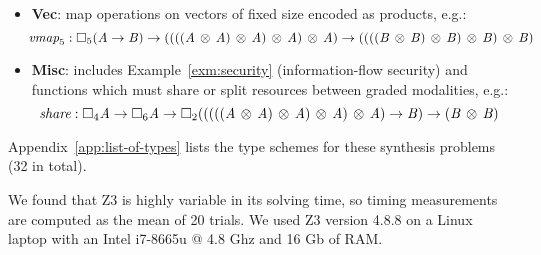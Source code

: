 \begin{itemize}[itemsep=0em,leftmargin=1.1em]
\item \textbf{Vec}: map operations on
vectors of fixed size encoded as products, e.g.:
%
\begin{equation*}
\!\!
\textit{vmap}_5 : \Box_{  5  }  (  \mathit{A}  \rightarrow  \mathit{B}  )    \rightarrow   (   (   (   (   \mathit{A}  \, \otimes \,  \mathit{A}   )  \, \otimes \,  \mathit{A}   )  \, \otimes \,  \mathit{A}   )  \, \otimes \,  \mathit{A}   )  \rightarrow  (   (   (   (   \mathit{B}  \, \otimes \,  \mathit{B}   )  \, \otimes \,  \mathit{B}   )  \, \otimes \,  \mathit{B}   )  \, \otimes \,  \mathit{B}   )
\end{equation*}
%

\item \textbf{Misc}: includes Example~\ref{exm:security}
  (information-flow security) and  functions which must share or split resources
between graded modalities, e.g.:
%
\begin{equation*}
\!\!
\textit{share}: \Box_{  4  }  \mathit{A}    \rightarrow     \Box_{  6  }  \mathit{A}    \rightarrow    \Box_{  2  }   (   (    (    (    (   \mathit{A}  \, \otimes \,  \mathit{A}   )   \, \otimes \,  \mathit{A}   )   \, \otimes \,  \mathit{A}   )   \, \otimes \,  \mathit{A}   )   \rightarrow  \mathit{B}  )       \rightarrow   (   \mathit{B}  \, \otimes \,  \mathit{B}   )
\end{equation*}
%
\end{itemize}
%
Appendix~\ref{app:list-of-types} lists the type schemes for these
synthesis problems (32 in total).

We found that Z3 is highly variable in its solving time, so timing
measurements are computed as the mean of 20 trials. We used
Z3 version 4.8.8 on a Linux laptop with an Intel i7-8665u @ 4.8 Ghz
and 16 Gb of RAM.


